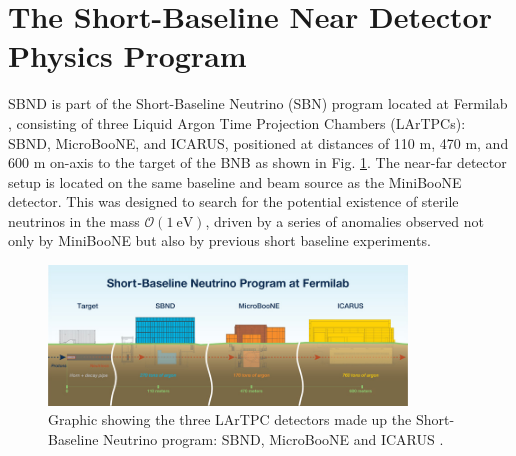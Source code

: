 \section{The Short-Baseline Near Detector Physics Program}
\label{sec4PhysicsProgram}

SBND is part of the Short-Baseline Neutrino (SBN) program located at Fermilab \cite{SBNProgram}, consisting of three Liquid Argon Time Projection Chambers (LArTPCs): SBND, MicroBooNE, and ICARUS, positioned at distances of 110 m, 470 m, and 600 m on-axis to the target of the BNB as shown in Fig. \ref{fig:SBN_program}.
The near-far detector setup is located on the same baseline and beam source as the MiniBooNE detector. 
This was designed to search for the potential existence of sterile neutrinos in the mass $\mathcal{O}(1~\mathrm{eV})$, driven by a series of anomalies observed not only by MiniBooNE but also by previous short baseline experiments.

\begin{figure}[hb!] 
\centering    
\includegraphics[width=0.85\textwidth]{SBN_program}
\caption[Short-Baseline Neutrino Program]{
Graphic showing the three LArTPC detectors made up the Short-Baseline Neutrino program: SBND, MicroBooNE and ICARUS \cite{SBNProgram}.
}
\label{fig:SBN_program}
\end{figure}

